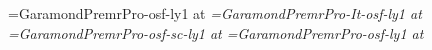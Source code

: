 \def\romantext{GaramondPremrPro-osf-ly1 }
\def\italictext{GaramondPremrPro-It-osf-ly1 }
\def\smallcaptext{GaramondPremrPro-osf-sc-ly1 }
\def\romantitlingtext{GaramondPremrPro-lf-titling-ly1 }
\def\romantitlingdisplay{GaramondPremrPro-Disp-lf-titling-ly1 }

\font\rm=\romantext at \textsize
\font\it=\italictext at \textsize
\font\sc=\smallcaptext at \textsize
\font\fineprint=\romantext at \smalltextsize

%
%

\def\useemptypageframe{
  \global\headline={\line{}}
  \global\footline={\line{}}
  \global\@cleared@pagefalse
  \global\@display@pagefalse
}

\def\usedisplaypageframe{\@display@pagetrue\@cleared@pagefalse}

\def\usenormalpageframe{
  \global\headline={\runningheaderfont\normalpageheadline}
  \global\footline={\runningheaderfont\normalpagefootline}
  \global\@cleared@pagefalse
  \global\@display@pagefalse
}

\def\displaypagefootline{\runningheaderfont\hfil\folio\hfil}
\def\normalpageheadline{\ifodd\pageno\normaloddpageheadline\else\normalevenpageheadline\fi}
\def\normalpagefootline{\line{}}
\def\normaloddpageheadline{\title\hfil\folio}
\def\normalevenpageheadline{\folio\hfil\author}


%
%

\def\nextpage{\vfil\eject\global\@cleared@pagetrue\global\@display@pagefalse\relax}
\def\nextoddpage{\nextpage\ifodd\pageno \else \line{}\nextpage\fi}
\def\nextevenpage{\nextpage\ifodd\pageno \line{}\nextpage\else \fi}

\def\titlepage#1#2#3{
  \nextoddpage
  \useemptypageframe
  \baselinebox{\booktitle{#1}}{10}{0}
  \baselinebox{\authorname{#2}}{6}{6}
  \rightline{#3}
  \eject
}

\def\previewannouncementpage#1{
  \nextoddpage
  \line{}\vfill
  \centerline{\linelogo}
  \vskip\baselineskip
  \centerline{\rm proudly announces}
  \vfill
  {\booktitlefont\centered #1\par}
  \vskip\baselineskip
  \centerline{by}
  \vskip\baselineskip
  \centerline{\authornamefont\author}
  \vfill
  \centerline{Turn the page for a preview}
  \vfill
}
\def\previewpage#1{
  \nextoddpage
  \baselinebox{\chaptertitle{#1}}{10}{}
  \useemptypageframe
}

